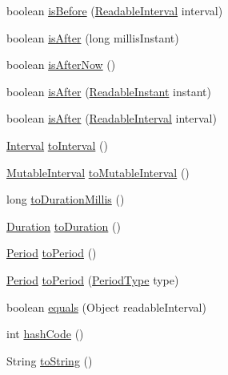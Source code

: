 \begin{DoxyCompactItemize}
\item 
boolean \hyperlink{classorg_1_1joda_1_1time_1_1base_1_1_abstract_interval_a1b43f964663f94150bd9bd1b6eefab67}{is\-Before} (\hyperlink{interfaceorg_1_1joda_1_1time_1_1_readable_interval}{Readable\-Interval} interval)
\item 
boolean \hyperlink{classorg_1_1joda_1_1time_1_1base_1_1_abstract_interval_a10a918b2674f0361dffdcde50e1911e1}{is\-After} (long millis\-Instant)
\item 
boolean \hyperlink{classorg_1_1joda_1_1time_1_1base_1_1_abstract_interval_a9fab448185ddea450513dcfdeac1ff17}{is\-After\-Now} ()
\item 
boolean \hyperlink{classorg_1_1joda_1_1time_1_1base_1_1_abstract_interval_a72b4b55901a6d59c638cf1899159e10c}{is\-After} (\hyperlink{interfaceorg_1_1joda_1_1time_1_1_readable_instant}{Readable\-Instant} instant)
\item 
boolean \hyperlink{classorg_1_1joda_1_1time_1_1base_1_1_abstract_interval_a48c5308640257d14209643fbe22c7a63}{is\-After} (\hyperlink{interfaceorg_1_1joda_1_1time_1_1_readable_interval}{Readable\-Interval} interval)
\item 
\hyperlink{classorg_1_1joda_1_1time_1_1_interval}{Interval} \hyperlink{classorg_1_1joda_1_1time_1_1base_1_1_abstract_interval_a6f4deeb092770dba877abef05236c388}{to\-Interval} ()
\item 
\hyperlink{classorg_1_1joda_1_1time_1_1_mutable_interval}{Mutable\-Interval} \hyperlink{classorg_1_1joda_1_1time_1_1base_1_1_abstract_interval_ab17efb388af0c348ba9124bec47af54d}{to\-Mutable\-Interval} ()
\item 
long \hyperlink{classorg_1_1joda_1_1time_1_1base_1_1_abstract_interval_aceace57eecdf852e9a018a4360165b0d}{to\-Duration\-Millis} ()
\item 
\hyperlink{classorg_1_1joda_1_1time_1_1_duration}{Duration} \hyperlink{classorg_1_1joda_1_1time_1_1base_1_1_abstract_interval_a89d371d40046dfcd06ba264386c39c14}{to\-Duration} ()
\item 
\hyperlink{classorg_1_1joda_1_1time_1_1_period}{Period} \hyperlink{classorg_1_1joda_1_1time_1_1base_1_1_abstract_interval_af16b4ac4bed7b8a7c40d28dddd891e0a}{to\-Period} ()
\item 
\hyperlink{classorg_1_1joda_1_1time_1_1_period}{Period} \hyperlink{classorg_1_1joda_1_1time_1_1base_1_1_abstract_interval_aa833dd7907723227a181ccaf2eb9631c}{to\-Period} (\hyperlink{classorg_1_1joda_1_1time_1_1_period_type}{Period\-Type} type)
\item 
boolean \hyperlink{classorg_1_1joda_1_1time_1_1base_1_1_abstract_interval_acf402c922932f7c75ba8eb5845726d79}{equals} (Object readable\-Interval)
\item 
int \hyperlink{classorg_1_1joda_1_1time_1_1base_1_1_abstract_interval_af592fe8095f9026bc71fde60eb14e366}{hash\-Code} ()
\item 
String \hyperlink{classorg_1_1joda_1_1time_1_1base_1_1_abstract_interval_aaf491c4e195569a584c2bc669c81a9aa}{to\-String} ()
\end{DoxyCompactItemize}
